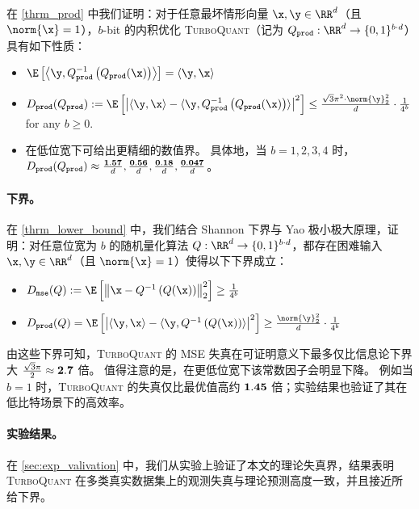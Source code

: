 \documentclass[11pt]{ctexart}
\newcommand{\TurboQuant}{\textsc{TurboQuant}\xspace}
\let\cref\ref
\begin{document}
在 \cref{thrm_prod} 中我们证明：对于任意最坏情形向量 $\x,\y\in\RR^d$（且 $\norm{\x}=1$），$b$-bit 的内积优化 \TurboQuant（记为 $Q_{\tt prod}: \RR^d \to \{ 0, 1 \}^{b \cdot d}$）具有如下性质：
\begin{itemize}
    \item $\E\left[ \left< \y, Q_{\tt prod}^{-1}\left( Q_{\tt prod}(\x) \right) \right> \right] = \langle \y, \x \rangle$
    \item $D_{\tt prod}(Q_{\tt prod}) := \E\left[\left| \langle \y, \x \rangle - \langle \y, Q_{\tt prod}^{-1}\left( Q_{\tt prod}(\x) \right) \rangle \right|^2 \right] \le \frac{\sqrt{3} \pi^2 \cdot \norm{\y}_2^2}{d} \cdot \frac{1}{4^{b}}$ for any $b \ge 0$.
    \item 在低位宽下可给出更精细的数值界。
    具体地，当 $b = 1, 2, 3, 4$ 时，$D_{\tt prod}(Q_{\tt prod}) \approx \frac{\bf 1.57}{d}, \frac{\bf 0.56}{d}, \frac{\bf 0.18}{d}, \frac{\bf 0.047}{d}$。
\end{itemize}


\paragraph{下界。}
在 \cref{thrm_lower_bound} 中，我们结合 Shannon 下界与 Yao 极小极大原理，证明：对任意位宽为 $b$ 的随机量化算法 $Q: \RR^d \to \{ 0, 1 \}^{b \cdot d}$，都存在困难输入 $\x, \y \in \RR^d$（且 $\norm{\x}=1$）使得以下下界成立：
\begin{itemize}
    \item $D_{\tt mse}(Q) := \E\left[\left\| \x - Q^{-1}\left( Q(\x) \right) \right\|_2^2 \right] \ge \frac{1}{4^{b}}$
    \item $D_{\tt prod}(Q) = \E\left[\left| \langle \y, \x \rangle - \langle \y, Q^{-1}\left( Q(\x) \right) \rangle \right|^2 \right] \ge \frac{\norm{\y}_2^2}{d} \cdot \frac{1}{4^{b}}$
\end{itemize}

由这些下界可知，\TurboQuant 的 MSE 失真在可证明意义下最多仅比信息论下界大 $\frac{\sqrt{3}\pi}{2}\approx{\bf 2.7}$ 倍。
值得注意的是，在更低位宽下该常数因子会明显下降。 
例如当 $b=1$ 时，\TurboQuant 的失真仅比最优值高约 ${\bf 1.45}$ 倍；实验结果也验证了其在低比特场景下的高效率。

\paragraph{实验结果。}
在 \cref{sec:exp_valivation} 中，我们从实验上验证了本文的理论失真界，结果表明 \TurboQuant 在多类真实数据集上的观测失真与理论预测高度一致，并且接近所给下界。
\end{document}
